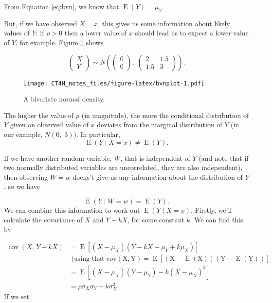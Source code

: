 \documentclass[
  openany]{book}
\theoremstyle{definition}
\theoremstyle{definition}
\theoremstyle{definition}
\theoremstyle{definition}
\theoremstyle{remark}
\begin{document}
From Equation \eqref{eq:bvn}, we know that \(\operatorname{E}\left(Y\right) = \mu_Y\).

But, if we have observed \(X=x\), this gives us some information about likely values of \(Y\): if \(\rho>0\) then a lower value of \(x\) should lead us to expect a lower value of \(Y\), for example. Figure \ref{fig:bvnplot} shows

\begin{equation}
\begin{pmatrix}
X\\
Y
\end{pmatrix} \sim N\left(
\begin{pmatrix}
0\\
0
\end{pmatrix},\;
\begin{pmatrix}
2 & 1.5 \\
1.5 & 3
\end{pmatrix}
\right).
\label{eq:bvneg}
\end{equation}

\begin{figure}
\centering
\texttt{[image: CT4H\_notes\_files/figure-latex/bvnplot-1.pdf]}
\caption{\label{fig:bvnplot}A bivariate normal density.}
\end{figure}

The higher the value of \(\rho\) (in magnitude), the more the conditional distribution of \(Y\) given an observed value of \(x\) deviates from the marginal distribution of \(Y\) (in our example, \(N\left(0,\;3\right)\)). In particular, \[\operatorname{E}\left(Y\mid{X=x}\right)\neq{\operatorname{E}\left(Y\right)}.\]

If we have another random variable, \(W\), that is independent of \(Y\) (and note that if two normally distributed variables are uncorrelated, they are also independent), then observing \(W=w\) doens't give us any information about the distribution of \(Y\), so we have

\[ \operatorname{E}\left(Y\mid{W=w}\right)={\operatorname{E}\left(Y\right)}. \]
We can combine this information to work out \(\operatorname{E}\left(Y\mid{X=x}\right)\). Firstly, we'll calculate the covariance of \(X\) and \(Y-kX\), for some constant \(k\). We can find this by

\[
\begin{aligned}
\operatorname{cov}\left(X,\,Y-kX\right) &= \operatorname{E}\left[\left(X-\mu_X\right)\left(Y-kX - \mu_Y + k\mu_X\right)\right]\\
&\text{ (using that }\operatorname{cov\left(X,Y\right)=\operatorname{E}\left[\left(X-\operatorname{E}\left(X\right)\right)\left(Y-\operatorname{E}\left(Y\right)\right)\right]}\\
& = \operatorname{E}\left[\left(X-\mu_X\right)\left(Y-\mu_Y\right) - k\left(X-\mu_X\right)^2\right]\\
& = \rho \sigma_X\sigma_Y - k\sigma_X^2.
\end{aligned}
\]
If we set
\end{document}
